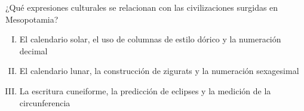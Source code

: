 ¿Qué expresiones culturales se relacionan con las civilizaciones surgidas en Mesopotamia?

\begin{enumerate}[I.]
	\item El calendario solar, el uso de columnas de estilo  dórico y la numeración decimal
	\item El calendario lunar, la construcción de zigurats y la numeración sexagesimal
	\item La escritura cuneiforme, la predicción de eclipses y la medición de la circunferencia  
\end{enumerate}


